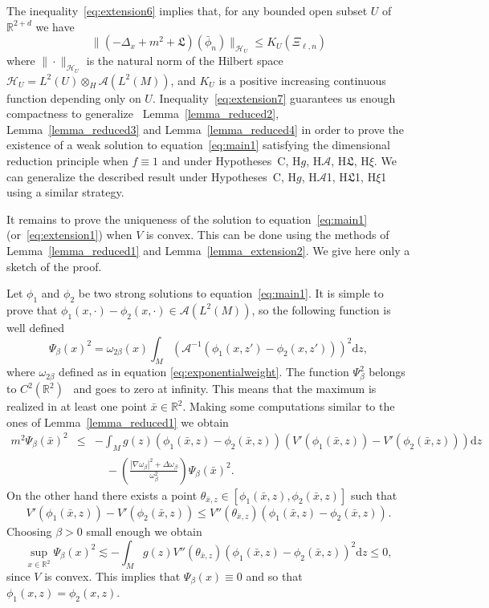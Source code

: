 \documentclass[a4paper,10pt]{article}
\newcommand{\mathd}{\mathrm{d}}
\begin{document}
The inequality~{\eqref{eq:extension6}} implies that, for any bounded open
subset $U$ of $\mathbb{R}^{2 + d}$ we have
\begin{equation}
  \| (- \Delta_x + m^2 + \mathfrak{L}) (\bar{\phi}_n) \|_{\mathcal{H}_U}
  \leqslant K_U (\Xi_{\ell, n}) \label{eq:extension7}
\end{equation}
where $\| \cdot \|_{\mathcal{H}_U}$ is the natural norm of the Hilbert space
$\mathcal{H}_U = L^2 (U) \otimes_H \mathcal{A} (L^2 (M))$, and $K_U$ is a
positive increasing continuous function depending only on $U$.
Inequality~{\eqref{eq:extension7}} guarantees us enough compactness to
generalize \ Lemma~\ref{lemma_reduced2}, Lemma~\ref{lemma_reduced3} and
Lemma~\ref{lemma_reduced4} in order to prove the existence of a weak solution
to equation~{\eqref{eq:main1}} satisfying the dimensional reduction principle
when $f \equiv 1$ and under Hypotheses~C, H$g$, H$\mathcal{A}$,
H$\mathfrak{L}$, H$\xi$. We can generalize the described result under
Hypotheses~C, H$g$, H$\mathcal{A}$1, H$\mathfrak{L}$1, H$\xi$1 using a similar
strategy.

It remains to prove the uniqueness of the solution to
equation~{\eqref{eq:main1}} (or~{\eqref{eq:extension1}}) when $V$ is convex.
This can be done using the methods of Lemma~\ref{lemma_reduced1} and
Lemma~\ref{lemma_extension2}. We give here only a sketch of the proof.

Let $\phi_1$ and $\phi_2$ be two strong solutions to
equation~{\eqref{eq:main1}}. It is simple to prove that $\phi_1 (x, \cdot) -
\phi_2 (x, \cdot) \in \mathcal{A} (L^2 (M))$, so the following function is
well defined
\[ \Psi_{\beta} (x)^2 = \omega_{2 \beta} (x) \int_M (\mathcal{A}^{- 1} (\phi_1
   (x, z') - \phi_2 (x, z')))^2 \mathd z, \]
where $\omega_{2 \beta}$ defined as in equation
{\eqref{eq:exponentialweight}}. The function $\Psi^2_{\beta}$ belongs to $C^2
(\mathbb{R}^2)$ \ and goes to zero at infinity. This means that the maximum is
realized in at least one point $\bar{x} \in \mathbb{R}^2 .$ Making some
computations similar to the ones of Lemma~\ref{lemma_reduced1} we obtain
\[ \begin{array}{lll}
     m^2 \Psi_{\beta} (\bar{x})^2 & \leqslant & - \int_M g (z) (\phi_1
     (\bar{x}, z) - \phi_2 (\bar{x}, z))_{} (V' (\phi_1 (\bar{x}, z)) - V'
     (\phi_2 (\bar{x}, z))) \mathd z\\
     &  & \quad - \left( \frac{| \nabla \omega_{\beta} |^2 + \Delta
     \omega_{\beta}}{\omega_{\beta}^2} \right) \Psi_{\beta} (\bar{x})^2 .
   \end{array} \]
On the other hand there exists a point $\theta_{\bar{x}, z} \in [\phi_1
(\bar{x}, z), \phi_2 (\bar{x}, z)]$ such that
\[ V' (\phi_1 (\bar{x}, z)) - V' (\phi_2 (\bar{x}, z)) \leqslant V''
   (\theta_{\bar{x}, z}) (\phi_1 (\bar{x}, z) - \phi_2 (\bar{x}, z))_{} . \]
Choosing $\beta > 0$ small enough we obtain
\[ \sup_{x \in \mathbb{R}^2} \Psi_{\beta} (x)^2 \lesssim - \int_M g (z) V''
   (\theta_{\bar{x}, z}) (\phi_1 (\bar{x}, z) - \phi_2 (\bar{x}, z))^2_{}
   \mathd z \leqslant 0, \]
since $V$ is convex. This implies that $\Psi_{\beta} (x) \equiv 0$ and so that
$\phi_1 (x, z) = \phi_2 (x, z)$.
\end{document}
